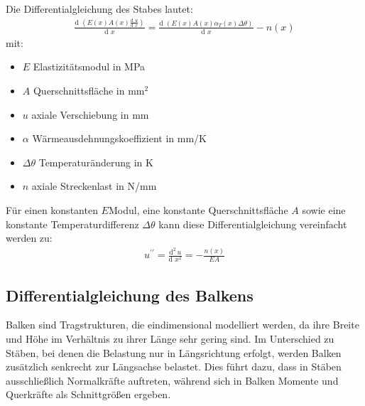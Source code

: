 \documentclass[letterpaper,10pt,german]{jupyterBook}
\begin{document}
\sphinxAtStartPar
Die Differentialgleichung des Stabes lautet:
\begin{equation}\label{equation:chapters/chapter1/strukturgleichungen:stabdgl}
\begin{split}\frac{\text{d } \left( E(x)A(x) \frac{\text{d } u}{\text{d } x} \right) }{\text{d } x} =  \frac{\text{d } \left(E(x)A(x) \alpha_T(x) \Delta \theta\right)}{\text{d } x} - n(x)\end{split}
\end{equation}
\sphinxAtStartPar
mit:
\begin{itemize}
\item {} 
\sphinxAtStartPar
\(E\) \sphinxhyphen{} Elastizitätsmodul in MPa

\item {} 
\sphinxAtStartPar
\(A\) \sphinxhyphen{} Querschnittsfläche in mm\(^2\)

\item {} 
\sphinxAtStartPar
\(u\) \sphinxhyphen{} axiale Verschiebung in mm

\item {} 
\sphinxAtStartPar
\(\alpha\) \sphinxhyphen{} Wärmeausdehnungskoeffizient in mm/K

\item {} 
\sphinxAtStartPar
\(\Delta \theta\) \sphinxhyphen{} Temperaturänderung in K

\item {} 
\sphinxAtStartPar
\(n\) \sphinxhyphen{} axiale Streckenlast in N/mm

\end{itemize}

\sphinxAtStartPar
Für einen konstanten \(E\)\sphinxhyphen{}Modul, eine konstante Querschnittsfläche \(A\) sowie eine konstante Temperaturdifferenz \(\Delta \theta\) kann diese Differentialgleichung vereinfacht werden zu:
\begin{equation}\label{equation:chapters/chapter1/strukturgleichungen:stabdglsimple}
\begin{split} u^{\prime \prime} = \frac{\text{d}^2\,  u  }{\text{d } x^2} =  - \frac{n(x)}{EA}\end{split}
\end{equation}



\subsection{Differentialgleichung des Balkens}
\label{\detokenize{chapters/chapter1/strukturgleichungen:differentialgleichung-des-balkens}}
\sphinxAtStartPar
Balken sind Tragstrukturen, die eindimensional modelliert werden, da ihre Breite und Höhe im Verhältnis zu ihrer Länge sehr gering sind. Im Unterschied zu Stäben, bei denen die Belastung nur in Längsrichtung erfolgt, werden Balken zusätzlich senkrecht zur Längsachse belastet. Dies führt dazu, dass in Stäben ausschließlich Normalkräfte auftreten, während sich in Balken Momente und Querkräfte als Schnittgrößen ergeben.
\end{document}
